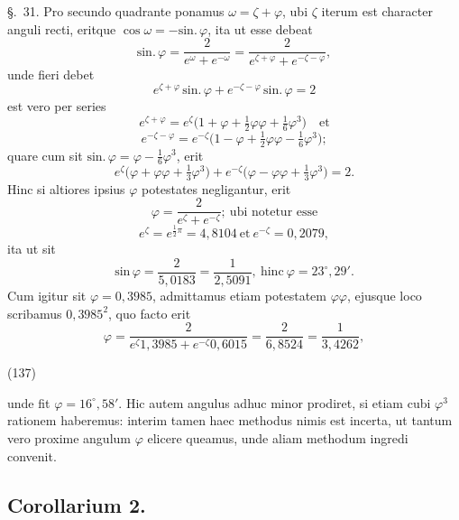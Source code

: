 \documentclass[11pt,a4paper]{article}
\begin{document}
§.~31. Pro secundo quadrante ponamus $\omega = \zeta + \varphi$, ubi
\emph{$\zeta$} iterum est character anguli recti, eritque
$\cos\omega = -\text{sin.}\,\varphi$, ita ut esse debeat
\[
\text{sin.}\,\varphi = \frac{2}{e^\omega + e^{-\omega}} = \frac{2}{e^{\zeta + \varphi} + e^{-\zeta - \varphi}},
\]
unde fieri debet
\[
e^{\zeta + \varphi}\,\text{sin.}\,\varphi + e^{-\zeta - \varphi}\,\text{sin.}\,\varphi = 2
\]
est vero per series
\[
e^{\zeta + \varphi} = e^\zeta\bigl(1 + \varphi + \tfrac{1}{2}\varphi\varphi + \tfrac{1}{6}\varphi^3\bigr) \quad\text{et}
\]
\[
e^{-\zeta - \varphi} = e^{-\zeta}\bigl(1 - \varphi + \tfrac{1}{2}\varphi\varphi - \tfrac{1}{6}\varphi^3\bigr);
\]
quare cum sit $\text{sin.}\,\varphi = \varphi - \frac{1}{6}\varphi^3$, erit
\[
e^\zeta\bigl(\varphi + \varphi\varphi + \tfrac{1}{3}\varphi^3\bigr) + e^{-\zeta}\bigl(\varphi - \varphi\varphi + \tfrac{1}{3}\varphi^3\bigr) = 2.
\]
Hinc si altiores ipsius $\varphi$ potestates negligantur, erit
\[
\varphi = \frac{2}{e^\zeta + e^{-\zeta}}; \ \text{ubi notetur esse}
\]
\[
e^\zeta = e^{\frac{1}{2}\pi} = 4{,}8104 \ \text{et}\ e^{-\zeta} = 0{,}2079,
\]
ita ut sit
\[
\text{sin}\,\varphi = \frac{2}{5{,}0183} = \frac{1}{2{,}5091}, \ \text{hinc}\ \varphi = 23^\circ, 29'.
\]
Cum igitur sit $\varphi = 0{,}3985$, admittamus etiam potestatem $\varphi\varphi$, ejusque
loco scribamus $0{,}3985^2$, quo facto erit
\[
\varphi = \frac{2}{e^\zeta 1{,}3985 + e^{-\zeta}0{,}6015} = \frac{2}{6{,}8524} = \frac{1}{3{,}4262},
\]

(137)

unde fit $\varphi = 16^\circ, 58'$. Hic autem angulus adhuc minor prodiret, si etiam
cubi $\varphi^3$ rationem haberemus: interim tamen haec methodus nimis est incerta, ut
tantum vero proxime angulum $\varphi$ elicere queamus, unde aliam methodum ingredi
convenit.

\subsection{Corollarium 2.}
\end{document}
